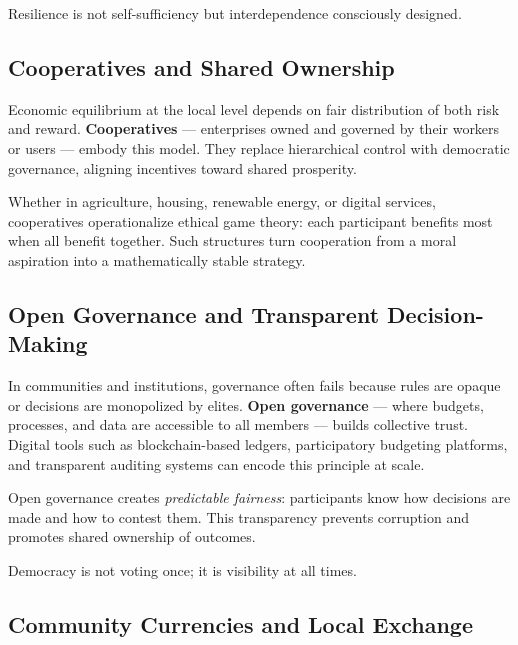 \documentclass[12pt,twoside]{book}
\begin{document}
\begin{keyidea}
Resilience is not self-sufficiency but interdependence consciously designed.
\end{keyidea}

\subsection*{Cooperatives and Shared Ownership}

Economic equilibrium at the local level depends on fair distribution of both risk and reward.  
\textbf{Cooperatives} --- enterprises owned and governed by their workers or users --- embody this model.  
They replace hierarchical control with democratic governance, aligning incentives toward shared prosperity.  

Whether in agriculture, housing, renewable energy, or digital services, cooperatives operationalize ethical game theory:  
each participant benefits most when all benefit together.  
Such structures turn cooperation from a moral aspiration into a mathematically stable strategy.

\subsection*{Open Governance and Transparent Decision-Making}

In communities and institutions, governance often fails because rules are opaque or decisions are monopolized by elites.  
\textbf{Open governance} --- where budgets, processes, and data are accessible to all members --- builds collective trust.  
Digital tools such as blockchain-based ledgers, participatory budgeting platforms, and transparent auditing systems can encode this principle at scale.  

Open governance creates \emph{predictable fairness}: participants know how decisions are made and how to contest them.  
This transparency prevents corruption and promotes shared ownership of outcomes.\\  

\begin{keyidea}
Democracy is not voting once; it is visibility at all times.
\end{keyidea}

\subsection*{Community Currencies and Local Exchange}
\end{document}
